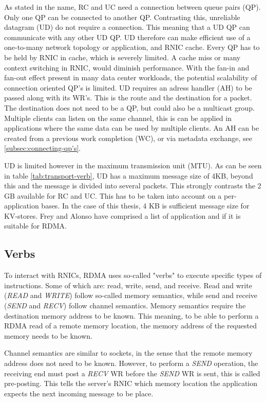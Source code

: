 As stated in the name, RC and UC need a connection between queue pairs (QP).
Only one QP can be connected to another QP.
Contrasting this, unreliable datagram (UD) do not require a connection.
This meaning that a UD QP can communicate with any other UD QP.
UD therefore can make efficient use of a one-to-many network topology or application, and RNIC cache.
Every QP has to be held by RNIC in cache, which is severely limited\cite{qiu2018toward}.
A cache miss or many context switching in RNIC, would diminish performance.
With the fan-in and fan-out effect present in many data center workloads\cite{vasudevan2009safe}, the potential scalability of connection oriented QP's is limited\cite{kalia2016fasst}.
UD requires an adress handler (AH) to be passed along with its WR's.
This is the route and the destination for a packet.
The destination does not need to be a QP, but could also be a multicast group.
Multiple clients can listen on the same channel, this is can be applied in applications where the same data can be used by multiple clients.
An AH can be created from a previous work completion (WC), or via metadata exchange, see \ref{subsec:connecting-qp's}.

UD is limited however in the maximum transmission unit (MTU).
As can be seen in table \ref{tab:transport-verb}, UD has a maximum message size of 4KB, beyond this and the message is divided into several packets.
This strongly contrasts the 2 GB available for RC and UC.
This has to be taken into account on a per-application bases.
In the case of this thesis, 4 KB is sufficient message size for KV-stores.
Frey and Alonso have comprised a list of application and if it is suitable for RDMA\cite{frey2009minimizing}.

\subsection{Verbs}\label{subsec:verbs}
To interact with RNICs, RDMA uses so-called "verbs" to execute specific types of instructions.
Some of which are: read, write, send, and receive.
Read and write (\textit{READ} and \textit{WRITE}) follow so-called memory semantics, while send and receive (\textit{SEND} and \textit{RECV}) follow channel semantics.
Memory semantics require the destination memory address to be known.
This meaning, to be able to perform a RDMA read of a remote memory location, the memory address of the requested memory needs to be known.

Channel semantics are similar to sockets, in the sense that the remote memory address does not need to be known.
However, to perform a \textit{SEND} operation, the receiving end must post a \textit{RECV} WR before the \textit{SEND} WR is sent, this is called pre-posting.
This tells the server's RNIC which memory location the application expects the next incoming message to be place.

